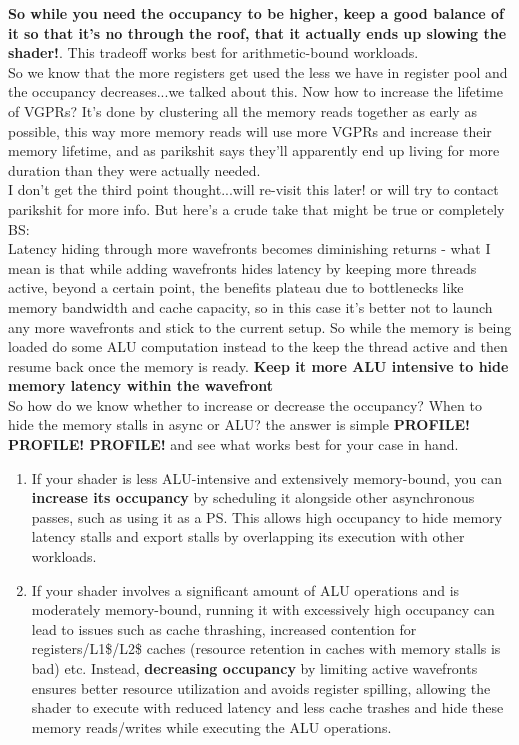 \documentclass[14pt]{article}
\begin{document}
	\textbf{So while you need the occupancy to be higher, keep a good balance of it so that it's no through the roof, that it actually ends up slowing the shader!}. This tradeoff works best for arithmetic-bound workloads. \\
	
		So we know that the more registers get used the less we have in register pool and the occupancy decreases...we talked about this. Now how to increase the lifetime of VGPRs?
		It's done by clustering all the memory reads together as early as possible, this way more memory reads will use more VGPRs and increase their memory lifetime, and as parikshit says they'll apparently end up living for more duration than they were actually needed. \\
		
		I don't get the third point thought...will re-visit this later! or will try to contact parikshit for more info. But here's a crude take that might be true or completely BS: \\
		Latency hiding through more wavefronts becomes diminishing returns - what I mean is that while adding wavefronts hides latency by keeping more threads active, beyond a certain point, the benefits plateau due to bottlenecks like memory bandwidth and cache capacity, so in this case it's better not to launch any more wavefronts and stick to the current setup. So while the memory is being loaded do some ALU computation instead to the keep the thread active and then resume back once the memory is ready. \textbf{Keep it more ALU intensive to hide memory latency within the wavefront} \\
		
		So how do we know whether to increase or decrease the occupancy? When to hide the memory stalls in async or ALU? the answer is simple \textbf{PROFILE! PROFILE! PROFILE!} and see what works best for your case in hand.

	\begin{enumerate}
		\item If your shader is less ALU-intensive and extensively memory-bound, you can \textbf{increase its occupancy} by scheduling it alongside other asynchronous passes, such as using it as a PS. This allows high occupancy to hide memory latency stalls and export stalls by overlapping its execution with other workloads.
		
    		\item If your shader involves a significant amount of ALU operations and is moderately memory-bound, running it with excessively high occupancy can lead to issues such as cache thrashing, increased contention for registers/L1\$/L2\$ caches (resource retention in caches with memory stalls is bad) etc. Instead, \textbf{decreasing occupancy} by limiting active wavefronts ensures better resource utilization and avoids register spilling, allowing the shader to execute with reduced latency and less cache trashes and hide these memory reads/writes while executing the ALU operations.
	\end{enumerate}
\end{document}
